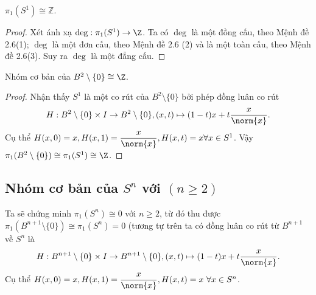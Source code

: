 	\begin{proposition} $\pi_1(S^1)\cong \mathbb{Z}$.
	\end{proposition}
	\begin{proof} 
		Xét ánh xạ $ \deg: \pi_1(S^1) \to \Z $.
		Ta có $\deg$ là một đồng cấu, theo Mệnh đề 2.6(1); $\deg $ là một đơn cấu, theo Mệnh đề 2.6 (2) và là một toàn cấu, theo Mệnh đề 2.6(3). Suy ra $\deg $ là một đẳng cấu.
	\end{proof}
	\begin{corollary}
		Nhóm cơ bản của $B^2\setminus\{0\} \cong \Z$.
	\end{corollary}
	\begin{proof}
		Nhận thấy $S^1$ là một co rút của $B^2\setminus\{0\}$ bởi phép đồng luân co rút 
		\[H:B^2\setminus\{0\}\times I\to B^2\setminus\{0\}, (x,t)\mapsto (1-t)x+t\dfrac{x}{\norm{x}}.\]
		Cụ thể $H(x,0)=x, H(x,1)=\dfrac{x}{\norm{x}}, H(x,t)=x \forall x\in S^1$.
		Vậy $\pi_1(B^2\setminus\{0\})\cong \pi_1(S^1)\cong \Z$.
	\end{proof}
	
\subsection{Nhóm cơ bản của $S^n$ với $(n\geq 2)$}
Ta sẽ chứng minh $\pi_1(S^n)\cong 0$ với $n\geq 2$, từ đó thu được $\pi_1(B^{n+1}\setminus\{0\})\cong \pi_1(S^n)=0$ (tương tự trên ta có đồng luân co rút từ $B^{n+1}$ về $S^n$ là \[H:B^{n+1}\setminus\{0\}\times I\to B^{n+1}\setminus\{0\}, (x,t)\mapsto (1-t)x+t\dfrac{x}{\norm{x}}.\]
Cụ thể $H(x,0)=x, H(x,1)=\dfrac{x}{\norm{x}}, H(x,t)=x ~\forall x\in S^n$.

